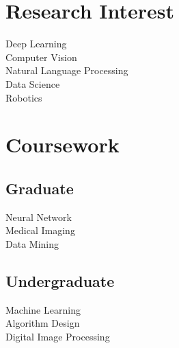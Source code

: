 \documentclass[]{deedy-resume-openfont}
\begin{document}
\begin{minipage}[t]{0.33\textwidth}
\section{Research Interest}
Deep Learning \\
Computer Vision \\
Natural Language Processing \\
Data Science \\
Robotics
\sectionsep


\section{Coursework}
\subsection{Graduate}
Neural Network \\
Medical Imaging \\
Data Mining \\
\sectionsep

\subsection{Undergraduate}
Machine Learning \\
Algorithm Design \\
Digital Image Processing \\
\sectionsep



\end{minipage}
\end{document}
